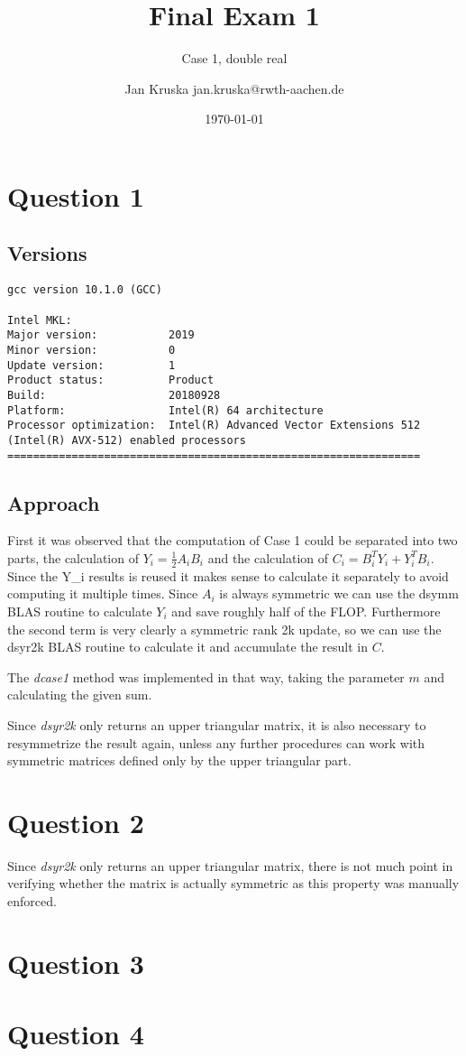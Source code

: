 \documentclass{scrartcl}
\title{Final Exam 1}
\subtitle{Case 1, double real}
\author{Jan Kruska jan.kruska@rwth-aachen.de}
\date{\today}
\begin{document}
\maketitle


\section{Question 1}
\subsection{Versions}
\begin{verbatim}
gcc version 10.1.0 (GCC)

Intel MKL:
Major version:           2019
Minor version:           0
Update version:          1
Product status:          Product
Build:                   20180928
Platform:                Intel(R) 64 architecture
Processor optimization:  Intel(R) Advanced Vector Extensions 512 (Intel(R) AVX-512) enabled processors
================================================================
\end{verbatim}

\subsection{Approach}

First it was observed that the computation of Case 1 could be separated into two parts, the calculation of $Y_i = \frac{1}{2}A_iB_i$ and the calculation of $C_i = B_i^TY_i + Y_i^TB_i$.
Since the Y_i results is reused it makes sense to calculate it separately to avoid computing it multiple times.
Since $A_i$ is always symmetric we can use the dsymm BLAS routine to calculate $Y_i$ and save roughly half of the FLOP.
Furthermore the second term is very clearly a symmetric rank 2k update, so we can use the dsyr2k BLAS routine to calculate it and accumulate the result in $C$.

The \emph{dcase1} method was implemented in that way, taking the parameter $m$ and calculating the given sum.

Since \emph{dsyr2k} only returns an upper triangular matrix, it is also necessary to resymmetrize the result again, unless any further procedures can work with symmetric matrices defined only by the upper triangular part.

\section{Question 2}

Since \emph{dsyr2k} only returns an upper triangular matrix, there is not much point in verifying whether the matrix is actually symmetric as this property was manually enforced. 

\section{Question 3}
\section{Question 4}
\end{document}
